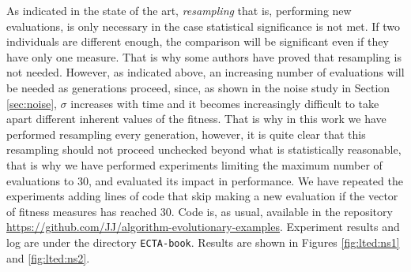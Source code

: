 \documentclass{svmult}
\begin{document}
As indicated in the state of the art, {\em resampling} that is,
performing new evaluations, is only necessary in the case statistical
significance is not met. If two individuals are different enough, the
comparison will be significant even if they have only one
measure. 
That is why some authors \cite{Qian:sampling} have proved that
resampling is not needed. However, as indicated above, an increasing
number of evaluations will be needed as generations proceed, since, as
shown in the noise study in Section \ref{sec:noise}, $\sigma$
increases with time and it becomes increasingly difficult to take
apart different inherent values of the fitness. 
That is why in this
work we have performed resampling every generation, however, it is
quite clear that this resampling should not proceed unchecked beyond
what is statistically reasonable, that is why we have performed
experiments limiting the maximum number of evaluations to 30, and
evaluated its impact in performance. We have repeated the experiments
adding lines of code that skip making a new evaluation if the vector
of fitness measures has reached 30.
Code is, as usual, available in
the repository
\url{https://github.com/JJ/algorithm-evolutionary-examples}. Experiment
results and log are under the directory {\tt ECTA-book}. Results are
shown in Figures \ref{fig:lted:ns1} and \ref{fig:lted:ns2}. 
\end{document}
